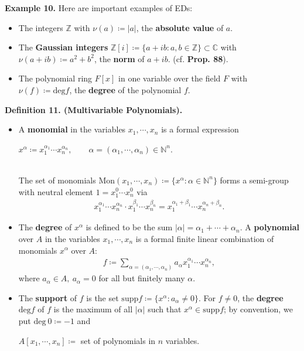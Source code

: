\documentclass[12pt,a4paper,footinclude=true,headinclude=true]{scrbook} %
\newenvironment{definition}[2][Definition]
    { \begin{mdframed}[backgroundcolor=gray!20] \textbf{#1 #2.}\ }
    {  \end{mdframed}}
\newenvironment{example}[2][Example]
    { \begin{mdframed}[backgroundcolor=gray!20] \textbf{#1 #2.} }
    {  \end{mdframed}}
\begin{document}
\begin{example}{10}
    Here are important examples of EDs:
    \begin{itemize}
        \item[(a)] The integers $\mathbb{Z}$ with $\nu(a)\coloneqq|a|$, the \textbf{absolute value} of $a$.
        \item[(b)] The \textbf{Gaussian integers} $\mathbb{Z}[i] \coloneqq\{a+ib:a,b\in\mathbb{Z}\}\subset\mathbb{C}$ with $\nu(a+ib)\coloneqq a^2+b^2$, the \textbf{norm} of $a+ib$. (cf. \textbf{Prop. 88}).
        \item[(c)] The polynomial ring $F[x]$ in one variable over the field $F$ with $\nu(f)\coloneqq\mathrm{deg}f$, the \textbf{degree} of the polynomial $f$.
    \end{itemize}
\end{example}

\begin{definition}{11. (Multivariable Polynomials)}
    \begin{itemize}
        \item A \textbf{monomial} in the variables $x_1,\cdots,x_n$ is a formal expression\\ \centerline{$x^{\alpha}\coloneqq x_1^{\alpha_1}\cdots x_n^{\alpha_n},\qquad \alpha=(\alpha_1,\cdots,\alpha_n)\in \mathbb{N}^n$.}\\
        The set of monomials $\mathrm{Mon}(x_1,\cdots,x_n)\coloneqq \{x^\alpha:\alpha\in\mathbb{N}^n\}$ forms a semi-group with neutral element $1=x_1^0\cdots x_n^0$ via 
        \begin{align*}
            x_1^{\alpha_1}\cdots x_n^{\alpha_n}\cdot x_1^{\beta_1}\cdots x_n^{\beta_n}=x_1^{\alpha_1+\beta_1}\cdots x_n^{\alpha_n+\beta_n}.
        \end{align*}
        \item The \textbf{degree} of $x^\alpha$ is defined to be the sum $|\alpha|=\alpha_1+ \cdots+\alpha_n$. A \textbf{polynomial} over $A$ in the variables $x_1,\cdots,x_n$ is a formal finite linear combination of monomials $x^\alpha$ over $A$: 
        \begin{align*}
            f\coloneqq\sum_{\alpha=(\alpha_1,\cdots,\alpha_n)} a_\alpha x_1^{\alpha_1}\cdots x_n^{\alpha_n},
        \end{align*}
        where $a_\alpha\in A,\ a_\alpha=0$ for all but finitely many $\alpha$.
        \item The \textbf{support} of $f$ is the set $\mathrm{supp}f\coloneqq \{x^\alpha:a_\alpha\neq0\}$. For $f\neq0$, the \textbf{degree} $\mathrm{deg}f$ of $f$ is the maximum of all $|\alpha|$ such that $x^\alpha\in\mathrm{supp}f$; by convention, we put $\mathrm{deg}\ 0 \coloneqq-1$ and \\ \centerline{$A[x_1,\cdots,x_n]\coloneqq$ set of polynomials in $n$ variables.}
    \end{itemize}
\end{definition}
\end{document}
